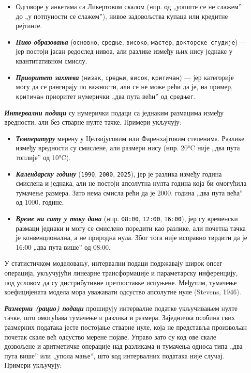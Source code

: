 \begin{itemize}
  \item Одговоре у анкетама са Ликертовом скалом (нпр. од „уопште се не слажем” до „у потпуности се слажем”), нивое задовољства купаца или кредитне рејтинге.
  \item \textbf{\textit{Ниво образовања}} (\texttt{основно}, \texttt{средње}, \texttt{високо}, \texttt{мастер}, \texttt{докторске студије}) — јер постоји јасан редослед нивоа, али разлике између њих нису једнаке у квантитативном смислу.
  \item \textbf{\textit{Приоритет захтева}} (\texttt{низак}, \texttt{средњи}, \texttt{висок}, \texttt{критичан}) — јер категорије могу да се рангирају по важности, али се не може рећи да је, на пример, \texttt{критичан} приоритет нумерички „два пута већи” од \texttt{средњег}.
\end{itemize}
\textbf{\textit{Интервални подаци}} су нумерички подаци са једнаким размацима између вредности, али без стварне нулте тачке. Примери укључују:

\begin{itemize}
  \item \textbf{\textit{Температуру}} мерену у Целзијусовим или Фаренхајтовим степенима. Разлике између вредности су смислене, али размери нису (нпр. 20°C није „два пута топлије” од 10°C).
  \item \textbf{\textit{Календарску годину}} (\texttt{1990}, \texttt{2000}, \texttt{2025}), јер је разлика између година смислена и једнака, али не постоји апсолутна нулта година која би омогућила тумачење размера. Зато нема смисла рећи да је 2000. година „два пута већа” од 1000. године.
  \item \textbf{\textit{Време на сату у току дана}} (нпр. \texttt{08:00}, \texttt{12:00}, \texttt{16:00}), јер су временски размаци једнаки и могу се смислено поредити као разлике, али почетна тачка је конвенционална, а не природна нула. Због тога није исправно тврдити да је 16:00 „два пута више” од 08:00.
\end{itemize}

У статистичком моделовању, интервални подаци подржавају широк опсег операција, укључујући линеарне трансформације и параметарску инференцију, под условом да су дистрибутивне претпоставке испуњене. Међутим, тумачење коефицијената модела мора уважавати одсуство апсолутне нуле (Stevens, 1946).

\textbf{\textit{Размерни (рацио) подаци}} проширују интервалне податке укључивањем нулте тачке, што омогућава тумачење и разлика и размера. Заједничка особина свих размерних података јесте постојање стварне нуле, која не представља произвољан почетак скале већ одсуство мерене појаве. Управо зато су код ове скале дозвољене и аритметичке операције над разликама и тумачења односа типа „два пута више” или „упола мање”, што код интервалних података није случај. Примери укључују:

